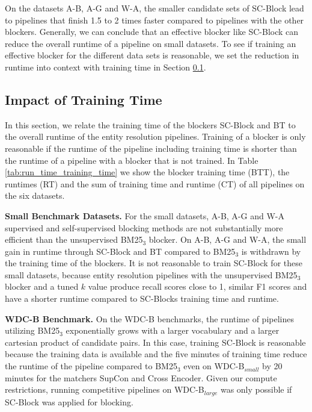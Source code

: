 \documentclass[sigconf,nonacm]{acmart}
\begin{document}
On the datasets A-B, A-G and W-A, the smaller candidate sets of SC-Block lead to pipelines that finish 1.5 to 2 times faster compared to pipelines with the other blockers.
Generally, we can conclude that an effective blocker like SC-Block can reduce the overall runtime of a pipeline on small datasets.
To see if training an effective blocker for the different data sets is reasonable, we set the reduction in runtime into context with training time in Section \ref{sub-sec:impact_of_training_time}.


\subsection{Impact of Training Time}
\label{sub-sec:impact_of_training_time}

In this section, we relate the training time of the blockers SC-Block and BT to the overall runtime of the entity resolution pipelines.
Training of a blocker is only reasonable if the runtime of the pipeline including training time is shorter than the runtime of a pipeline with a blocker that is not trained.
In Table \ref{tab:run_time_training_time} we show the blocker training time (BTT), the runtimes (RT) and the sum of training time and runtime (CT) of all pipelines on the six datasets.


\vspace{.1cm}\noindent\textbf{Small Benchmark Datasets.}
For the small datasets, A-B, A-G and W-A supervised and self-supervised blocking methods are not substantially more efficient than the unsupervised BM25$_3$ blocker. On A-B, A-G and W-A, the small gain in runtime through SC-Block and BT compared to BM25$_3$ is withdrawn by the training time of the blockers.
It is not reasonable to train SC-Block for these small datasets, because entity resolution pipelines with the unsupervised BM25$_3$ blocker and a tuned $k$ value produce recall scores close to 1, similar F1 scores and have a shorter runtime compared to SC-Blocks training time and runtime. 

\vspace{.1cm}\noindent\textbf{WDC-B Benchmark.}
On the WDC-B benchmarks, the runtime of pipelines utilizing BM25$_3$ exponentially grows with a larger vocabulary and a larger cartesian product of candidate pairs.
In this case, training SC-Block is reasonable because the training data is available and the five minutes of training time reduce the runtime of the pipeline compared to BM25$_3$ even on WDC-B$_{small}$ by 20 minutes for the matchers SupCon and Cross Encoder.
Given our compute restrictions, running competitive pipelines on WDC-B$_{large}$ was only possible if SC-Block was applied for blocking.
\end{document}
